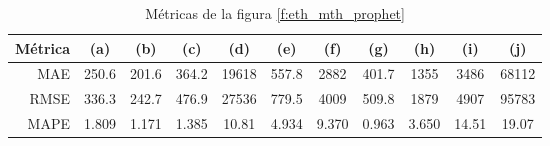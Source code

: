 \documentclass[a4paper,10pt]{article}
\begin{document}
\begin{table}[t]
 \begin{center}
  \begin{tabular}{|r|c|c|c|c|c|c|c|c|c|c|}
    Métrica & (a) & (b) & (c) & (d) & (e) & (f) & (g) & (h) & (i) & (j) \\ \hline
    MAE  & 250.6 & 201.6 & 364.2 & 19618 & 557.8 & 2882 & 401.7 & 1355 & 3486 & 68112 \\
    RMSE & 336.3 & 242.7 & 476.9 & 27536 & 779.5 & 4009 & 509.8 & 1879 & 4907 & 95783 \\
    MAPE & 1.809 & 1.171 & 1.385 & 10.81 & 4.934 & 9.370 & 0.963 & 3.650 & 14.51 & 19.07 \\ \hline
  \end{tabular}
  \caption{Métricas de la figura \ref{f:eth_mth_prophet}}
  \label{tab:eth_prophet_m}
 \end{center}
\end{table}
\end{document}
